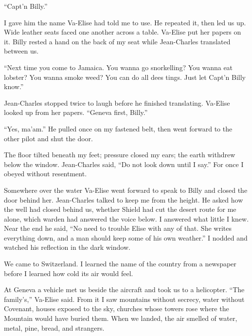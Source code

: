 ``Capt'n Billy.''\par

I gave him the name Va-Elise had told me to use. He repeated it, then led us up. Wide leather seats faced one another across a table. Va-Elise put her papers on it. Billy rested a hand on the back of my seat while Jean-Charles translated between us.\par

``Next time you come to Jamaica. You wanna go snorkelling? You wanna eat lobster? You wanna smoke weed? You can do all dees tings. Just let Capt'n Billy know.''\par

Jean-Charles stopped twice to laugh before he finished translating. Va-Elise looked up from her papers. ``Geneva first, Billy.''\par

``Yes, ma'am.'' He pulled once on my fastened belt, then went forward to the other pilot and shut the door.\par

The floor tilted beneath my feet; pressure closed my ears; the earth withdrew below the window. Jean-Charles said, ``Do not look down until I say.'' For once I obeyed without resentment.\par

Somewhere over the water Va-Elise went forward to speak to Billy and closed the door behind her. Jean-Charles talked to keep me from the height. He asked how the well had closed behind us, whether Shield had cut the desert route for me alone, which warden had answered the voice below. I answered what little I knew. Near the end he said, ``No need to trouble Elise with any of that. She writes everything down, and a man should keep some of his own weather.'' I nodded and watched his reflection in the dark window.\par

We came to Switzerland. I learned the name of the country from a newspaper before I learned how cold its air would feel.\par

At Geneva a vehicle met us beside the aircraft and took us to a helicopter. ``The family's,'' Va-Elise said. From it I saw mountains without secrecy, water without Covenant, houses exposed to the sky, churches whose towers rose where the Mountain would have buried them. When we landed, the air smelled of water, metal, pine, bread, and strangers.\par

